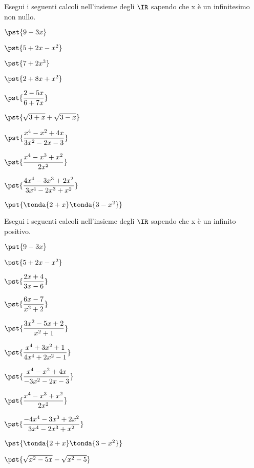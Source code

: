 \subsubsection*{}

\begin{esercizio}\label{ese:iper_op_01}
Esegui i seguenti calcoli nell'insieme degli \(\IR\) sapendo che 
x è un infinitesimo non nullo.
\begin{multicols}{2}
\begin{enumeratea}
 \item \(\pst{9 -3x}\)
 \item \(\pst{5 +2x -x^2}\)
 \item \(\pst{7 +2x^3}\) 
 \item \(\pst{2+8x+x^2}\) 
 \item \(\pst{\dfrac{2-5x}{6 +7x}}\)
 \item \(\pst{\sqrt{3 +x} + \sqrt{3 -x}}\) 
 \item \(\pst{\dfrac{x^4 - x^2 + 4x}{3x^2 -2x -3}}\) 
 \item \(\pst{\dfrac{x^4 - x^3 + x^2}{2x^2}}\) 
 \item \(\pst{\dfrac{4x^4 - 3x^3 + 2x^2}{3x^4 -2x^3 +x^2}} \) 
 \item \(\pst{\tonda{2+x}\tonda{3-x^2}} \)  
\end{enumeratea}
\end{multicols}
\end{esercizio}

\begin{esercizio}\label{ese:iper_op_01}
Esegui i seguenti calcoli nell'insieme degli \(\IR\) sapendo che 
x è un infinito positivo.
\begin{multicols}{2}
\begin{enumeratea}
 \item \(\pst{9 -3x}\)
 \item \(\pst{5 +2x -x^2}\)
 \item \(\pst{\dfrac{2x +4}{3x-6}}\)
 \item \(\pst{\dfrac{6 x-7}{x^2 +2}}\)
 \item \(\pst{\dfrac{3x^2 -5x +2}{x^2 +1}}\)
 \item \(\pst{\dfrac{x^4 +3x^2 +1}{4x^4 +2x^2 -1}}\)
 \item \(\pst{\dfrac{x^4 - x^2 + 4x}{-3x^2 -2x -3}}\) 
 \item \(\pst{\dfrac{x^4 - x^3 + x^2}{2x^2}}\) 
 \item \(\pst{\dfrac{-4x^4 - 3x^3 + 2x^2}{3x^4 -2x^3 +x^2}} \) 
 \item \(\pst{\tonda{2+x}\tonda{3-x^2}} \)  
 \item \(\pst{\sqrt{x^2-5x} - \sqrt{x^2-5}}\) 
\end{enumeratea}
\end{multicols}
\end{esercizio}

